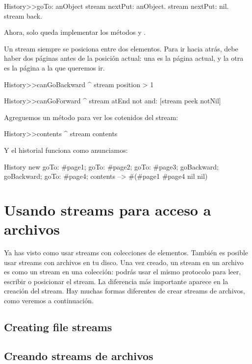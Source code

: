 \documentclass[a4paper,10pt,twoside]{book}
\begin{document}
{\begin{code}{}
History>>goTo: anObject
  stream nextPut: anObject.
  stream nextPut: nil.
  stream back.
\end{code}

Ahora, solo queda implementar los m\'etodos  y .

Un stream siempre se posiciona entre dos elementos. Para ir hacia atr\'as,
debe haber dos p\'aginas antes de la posici\'on actual: una es la p\'agina actual,
y la otra es la p\'agina a la que queremos ir. 

\begin{code}{}
History>>canGoBackward
  ^ stream position > 1

History>>canGoForward
  ^ stream atEnd not and: [stream peek notNil]
\end{code}

Agreguemos un m\'etodo para ver los cotenidos del stream:
\begin{code}{}
History>>contents
  ^ stream contents
\end{code}

Y el historial funciona como anunciamos:
\begin{code}{}
History new
	goTo: #page1;
	goTo: #page2;
	goTo: #page3;
	goBackward;
	goBackward;
	goTo: #page4;
	contents --> #(#page1 #page4 nil nil)
\end{code}

\section{Usando streams para acceso a archivos}

Ya has visto como usar streams con colecciones de elementos. Tambi\'en es posible
usar streams con archivos en tu disco. 
Una vez creado, un stream en un archivo es como un stream en una colecci\'on:
podr\'as usar el mismo protocolo para leer, escribir o posicionar el stream.
La diferencia m\'as importante aparece en la creaci\'on del stream.
Hay muchas formas diferentes de crear streams de archivos, como veremos a continuaci\'on.
 
\subsection{Creating file streams}
\subsection{Creando streams de archivos}

}
\end{document}
